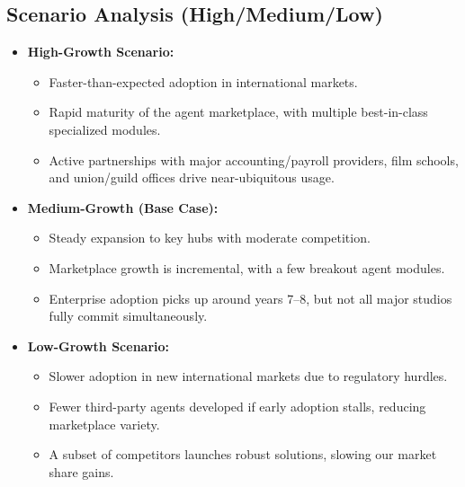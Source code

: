 \documentclass[11pt]{article}
\begin{document}
\subsection{Scenario Analysis (High/Medium/Low)}
\begin{itemize}
    \item \textbf{High-Growth Scenario:}
    \begin{itemize}
        \item Faster-than-expected adoption in international markets.
        \item Rapid maturity of the agent marketplace, with multiple best-in-class specialized modules.
        \item Active partnerships with major accounting/payroll providers, film schools, and union/guild offices drive near-ubiquitous usage.
    \end{itemize}
    \item \textbf{Medium-Growth (Base Case):}
    \begin{itemize}
        \item Steady expansion to key hubs with moderate competition.
        \item Marketplace growth is incremental, with a few breakout agent modules.
        \item Enterprise adoption picks up around years 7--8, but not all major studios fully commit simultaneously.
    \end{itemize}
    \item \textbf{Low-Growth Scenario:}
    \begin{itemize}
        \item Slower adoption in new international markets due to regulatory hurdles.
        \item Fewer third-party agents developed if early adoption stalls, reducing marketplace variety.
        \item A subset of competitors launches robust solutions, slowing our market share gains.
    \end{itemize}
\end{itemize}
\end{document}
